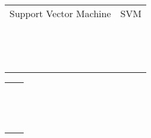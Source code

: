 \begin{thesisacronyms}
%
\begin{table}		
	\centering	
		\begin{tabular}{ l l }

		Support Vector Machine & SVM \\
		 & \\
		 & \\
		 & \\
		 & \\
		 & \\
		 & \\
		 & \\
		 & \\
		 & \\
		 & \\
		 & \\
		 & \\
		 & \\
		 & \\
		\end{tabular}
\end{table}	

	

\begin{table}[t]		
	\centering
		\begin{tabular}{ l l }
		 & \\
		 & \\
		 & \\
		 & \\
		 & \\
		 & \\
		 & \\
		 & \\
		 & \\
		 & \\
		 & \\
		 & \\
		 & \\
		 & \\
		\end{tabular}
\end{table}	

\end{thesisacronyms}